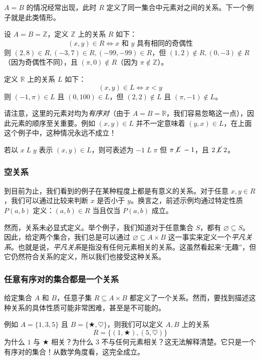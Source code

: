 $A = B$ 的情况经常出现，此时 $R$ 定义了同一集合中元素对之间的关系。下一个例子就是此类情形。\\

\begin{example} \label{ex:example6.2.5}
    设 $A=B=\mathbb{Z}$，定义 $\mathbb{Z}$ 上的关系 $R$ 如下：
    \[(x, y) \in R \iff x \text{\ 和\ } y \text{\ 具有相同的奇偶性}\]
    则 $(2,8) \in R, (-3, 7) \in R, (-99, -99) \in R$，但 $(1,2) \notin R, (0, -3) \notin R$（因为奇偶性不同），且 $(\pi, 0) \notin R$（因为 $\pi \notin \mathbb{Z}$）。
\end{example}

\begin{example} \label{ex:example6.2.6}
    定义 $\mathbb{R}$ 上的关系 $L$ 如下：
    \[(x, y) \in L \iff x < y\]
    则 $(-1, \pi) \in L$ 且 $(0, 100) \in L$，但 $(2, 2) \notin L$ 且 $(\pi, -1) \notin L$。
\end{example}

请注意，这里的元素对均为\emph{有序对}（由于 $A = B = \mathbb{R}$，我们容易忽略这一点），因此元素的顺序至关重要。例如 $(x, y) \in L$ 并不一定意味着 $(y, x) \in L$，在上面这个例子中，这种情况永远不成立！

若以 $x \;L\; y$ 表示 $(x, y) \in L$，则可表述为 $-1 \;L\; \pi$ 但 $\pi \;\cancel{L}\; -1$，且 $2 \;\cancel{L}\; 2$。

\subsubsection*{空关系}

\begin{remark}
    到目前为止，我们看到的例子在某种程度上都是有意义的关系。对于任意 $x,y \in R$，我们可以通过比较来判断 $x$ 是否小于 $y$。换言之，前述示例均通过特定性质 $P(a,b)$ 定义：$(a, b) \in R$ 当且仅当 $P(a,b)$ 成立。
\end{remark}

然而，关系未必显式定义。举个例子，我们知道对于任意集合 $S$，都有 $\varnothing \subseteq S$。因此，给定两个集合，我们总是可以通过 $\varnothing \subseteq A \times B$ 这一事实来定义一个\emph{平凡关系}。也就是说，\emph{平凡关系}是指没有任何元素相关的关系。这虽然看起来``无趣''，但它仍然符合关系的定义，所以我们也接受这种关系。

\subsubsection*{任意有序对的集合都是一个关系}

\begin{remark}
    给定集合 $A$ 和 $B$，任意子集 $R \subseteq A \times B$ 都定义了一个关系。然而，要找到描述这种关系的具体性质可能非常困难，甚至是不可能的。

    例如 $A=\{1,3,5\}$ 且 $B=\{\bigstar, \heartsuit\}$，则我们可以定义 $A, B$ 上的关系
    \[R=\{(1,\bigstar), (5, \heartsuit)\}\]
    为什么 $1$ 与 $\bigstar$ 相关？为什么 $3$ 不与任何元素相关？这无法解释清楚。它只是一个有序对的集合！从数学角度看，这完全成立。
\end{remark}

